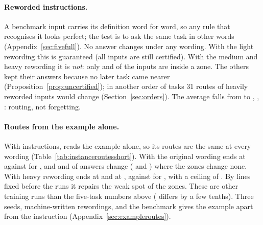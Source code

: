 \paragraph{Reworded instructions.}\label{sec:reworded} A benchmark input carries its definition word for
word, so any rule that recognises it looks perfect; the test is to ask the same task in other words
(Appendix~\ref{sec:fivefull}). No answer changes under any wording. With the light rewording this is
guaranteed (all \FiveCertZoneOneLight{} inputs are still certified). With the medium and heavy rewording it
is \emph{not}: only \FiveCertZoneOneMedium{} and \FiveCertZoneOneHeavy{} of the \FiveCertInputsOne{}
inputs are inside a zone. The others kept their answers because no later task came nearer
(Proposition~\ref{prop:uncertified}); in another order of tasks 31 routes of heavily reworded inputs
would change (Section~\ref{sec:orders}). The average falls from \FiveCertAP{} to \FiveCertAPLight{},
\FiveCertAPMedium{}, \FiveCertAPHeavy{}: routing, not forgetting.

\paragraph{Routes from the example alone.}\label{sec:fromexample} With instructions, \recog{} reads
the example alone, so its routes are the same at every wording (Table~\ref{tab:instanceroutesshort}).
With the original wording \recog{} ends at \AudUThreeOriginalRidgeAPOne{} against \AudUThreeOriginalCertAPOne{}
for \cert{}, and \AudUThreeOriginalRidgeChanged{} and \AudUThreeOriginalHandicapChanged{} of \AudUThreeCompared{}
answers change (\recog{} and \handicap{}) where the zones change none. With heavy rewording \recog{} ends
at \AudUThreeHeavyRidgeAPOne{} and \handicap{} at \AudUThreeHeavyHandicapAPOne{}, against \AudUThreeHeavyCertAPOne{} for
\cert{}, with a ceiling of \AudUThreeHeavyOwnAPOne{}. By lines fixed before the runs it repairs the weak
spot of the zones. These are other training runs than the five-task numbers above (\cert{} differs by a few tenths). Three seeds, machine-written rewordings, and the benchmark gives the example
apart from the instruction (Appendix~\ref{sec:exampleroutes}).

\begin{table}[t]
  \caption{Five tasks with instructions, original and heavily reworded; re-test, means over three seeds (changed answers summed). Zones read the instruction, \recog{} and \handicap{} the example alone. Last rows: the published methods.}
  \label{tab:instanceroutesshort}
  \centering
  
\end{table}


